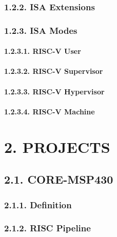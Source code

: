 \documentclass[]{article}
\let\oldparagraph\paragraph
\renewcommand{\paragraph}[1]{\oldparagraph{#1}\mbox{}}
\begin{document}
\hypertarget{isa-extensions}{%
\subsubsection{1.2.2. ISA Extensions}\label{isa-extensions}}

\hypertarget{isa-modes}{%
\subsubsection{1.2.3. ISA Modes}\label{isa-modes}}

\hypertarget{risc-v-user}{%
\paragraph{1.2.3.1. RISC-V User}\label{risc-v-user}}

\hypertarget{risc-v-supervisor}{%
\paragraph{1.2.3.2. RISC-V Supervisor}\label{risc-v-supervisor}}

\hypertarget{risc-v-hypervisor}{%
\paragraph{1.2.3.3. RISC-V Hypervisor}\label{risc-v-hypervisor}}

\hypertarget{risc-v-machine}{%
\paragraph{1.2.3.4. RISC-V Machine}\label{risc-v-machine}}

\hypertarget{projects}{%
\section{2. PROJECTS}\label{projects}}

\hypertarget{core-msp430}{%
\subsection{2.1. CORE-MSP430}\label{core-msp430}}

\hypertarget{definition}{%
\subsubsection{2.1.1. Definition}\label{definition}}

\hypertarget{risc-pipeline}{%
\subsubsection{2.1.2. RISC Pipeline}\label{risc-pipeline}}
\end{document}
